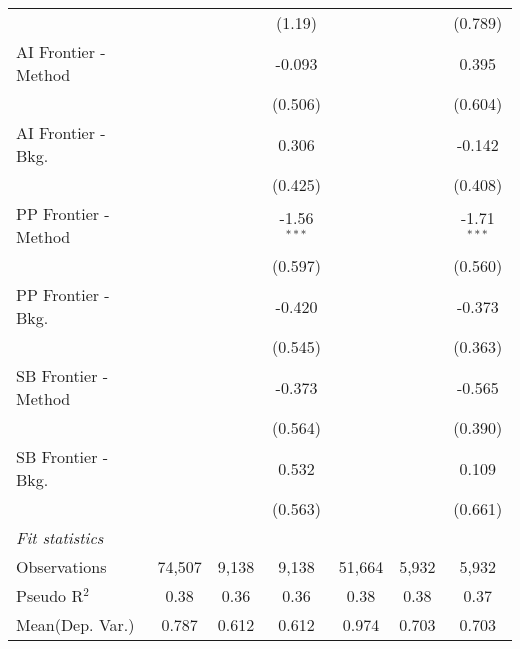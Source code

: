 \begin{tabular}{lcccccc}
                        &         &               & (1.19)        &         &               & (0.789)\\   
   AI Frontier - Method &         &               & -0.093        &         &               & 0.395\\   
                        &         &               & (0.506)       &         &               & (0.604)\\   
   AI Frontier - Bkg.   &         &               & 0.306         &         &               & -0.142\\   
                        &         &               & (0.425)       &         &               & (0.408)\\   
   PP Frontier - Method &         &               & -1.56$^{***}$ &         &               & -1.71$^{***}$\\   
                        &         &               & (0.597)       &         &               & (0.560)\\   
   PP Frontier - Bkg.   &         &               & -0.420        &         &               & -0.373\\   
                        &         &               & (0.545)       &         &               & (0.363)\\   
   SB Frontier - Method &         &               & -0.373        &         &               & -0.565\\   
                        &         &               & (0.564)       &         &               & (0.390)\\   
   SB Frontier - Bkg.   &         &               & 0.532         &         &               & 0.109\\   
                        &         &               & (0.563)       &         &               & (0.661)\\   
   \midrule
   \emph{Fit statistics}\\
   Observations         & 74,507  & 9,138         & 9,138         & 51,664  & 5,932         & 5,932\\  
   Pseudo R$^2$         & 0.38    & 0.36          & 0.36          & 0.38    & 0.38          & 0.37\\  
Mean(Dep. Var.) & 0.787 & 0.612 & 0.612 & 0.974 & 0.703 & 0.703 \\
   

\end{tabular}
